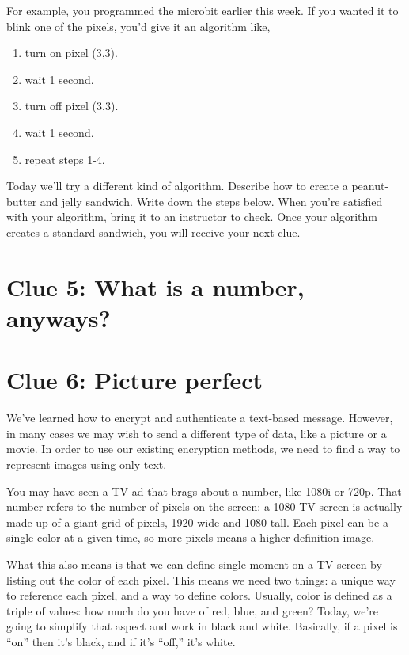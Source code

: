 \documentclass{article}
\begin{document}
For example, you programmed the microbit earlier this week. If you wanted it to blink one of the pixels, you'd give it an algorithm like,

\begin{enumerate}[noitemsep]
  \item turn on pixel (3,3).
  \item wait 1 second.
  \item turn off pixel (3,3).
  \item wait 1 second.
  \item repeat steps 1-4.
\end{enumerate}

Today we'll try a different kind of algorithm. Describe how to create a peanut-butter and jelly sandwich. Write down the steps below. When you're satisfied with your algorithm, bring it to an instructor to check. Once your algorithm creates a standard sandwich, you will receive your next clue.

\newpage

\section*{Clue 5: What is a number, anyways?}


\newpage

\section*{Clue 6: Picture perfect}
We've learned how to encrypt and authenticate a text-based message. However, in many cases we may wish to send a different type of data, like a picture or a movie. In order to use our existing encryption methods, we need to find a way to represent images using only text.

You may have seen a TV ad that brags about a number, like 1080i or 720p. That number refers to the number of pixels on the screen: a 1080 TV screen is actually made up of a giant grid of pixels, 1920 wide and 1080 tall. Each pixel can be a single color at a given time, so more pixels means a higher-definition image.

What this also means is that we can define single moment on a TV screen by listing out the color of each pixel. This means we need two things: a unique way to reference each pixel, and a way to define colors. Usually, color is defined as a triple of values: how much do you have of red, blue, and green? Today, we're going to simplify that aspect and work in black and white. Basically, if a pixel is  ``on'' then it's black, and if it's ``off,'' it's white. 
\end{document}
